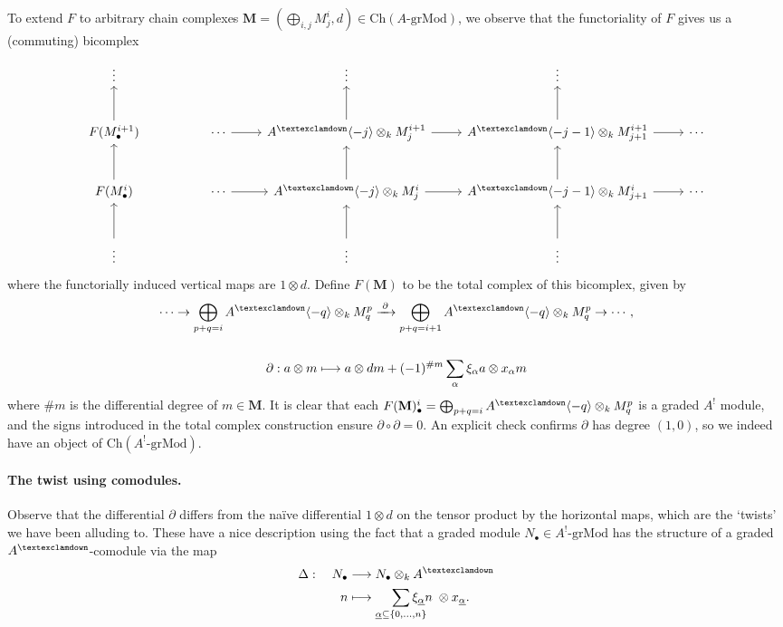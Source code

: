 \documentclass[a4paper]{article}
\theoremstyle{definition}
\theoremstyle{remark}
\newcommand{\grMod}{\ensuremath{\text{-grMod}}}
\newcommand{\Ch}{\ensuremath{\text{Ch}}}
\newcommand{\gnab}{{\textexclamdown}}
\begin{document}
To extend \(F\) to arbitrary chain complexes \(\mathbf{M}=(\bigoplus_{i,j}M^i_j,
d)\in \Ch(A\grMod)\), we observe that the functoriality of \(F\) gives us a (commuting) bicomplex
\[\begin{tikzcd}[row sep=large]
    \vdots 
           &            
           & 
           & \vdots 
           & \vdots 
           & \\
    F(M^{i+1}_\bullet) \arrow[u]
           & 
           & \cdots \arrow[r]
           & A^\gnab \langle -j \rangle\otimes_k M^{i+1}_j \arrow[r] \arrow[u]
           & A^\gnab \langle -j-1 \rangle\otimes_k M^{i+1}_{j+1} \arrow[r] \arrow[u]
           & \cdots \\
    F(M^{i}_\bullet) \arrow[u]
           & 
           & \cdots \arrow[r]
           & A^\gnab \langle -j \rangle\otimes_k M^{i}_j  \arrow[r] \arrow[u]
           & A^\gnab\langle -j-1 \rangle\otimes_k M^{i}_{j+1}  \arrow[r] \arrow[u]
           & \cdots \\
    \vdots \arrow[u]
           &            
           & 
           & \vdots \arrow[u] 
           & \vdots \arrow[u]
           &   
\end{tikzcd}\]
where the functorially induced vertical maps are \(1\otimes d\). Define
\(F(\mathbf{M})\) to be the total complex of this bicomplex, given by
\begin{gather*}
    \cdots \rightarrow \bigoplus_{p+q=i}A^\gnab\langle -q \rangle \otimes_k
    M^p_q \xrightarrow{\;\partial\;} \bigoplus_{p+q=i+1}A^\gnab\langle -q
    \rangle\otimes_k M^p_q \rightarrow \cdots,  \\ \\
    \partial: a\otimes m \longmapsto a\otimes dm + (-1)^{\#m}\sum_\alpha
    \xi_\alpha a \otimes x_\alpha m
\end{gather*}
where \(\#m\) is the differential degree of \(m\in \mathbf{M}\). It is clear
that each \(F(\textbf{M})^i_\bullet = \bigoplus_{p+q=i}A^\gnab\langle -q\rangle
\otimes_k M^p_q\) is a graded \(A^!\) module, and the signs introduced in the
total complex construction ensure \(\partial \circ \partial = 0\). An explicit
check confirms \(\partial\) has degree \((1,0)\), so we indeed have an object of
\(\Ch(A^!\grMod)\).

\paragraph{The twist using comodules.}
\label{comoduletwist}
Observe that the differential \(\partial\) differs from the na\"ive differential
\(1\otimes d\) on the tensor product by the horizontal maps, which are the
`twists' we have been alluding to. These have a nice description using the fact
that a graded module \(N_\bullet\in A^!\grMod\) has the structure of a
graded \(A^\gnab\)-comodule via the map
\begin{align*}
    \Delta: \quad N_\bullet &\longrightarrow N_\bullet \otimes_k A^\gnab \\
    n &\longmapsto \smashoperator[r]{\sum\limits_{\underline{\alpha}\subseteq
    \{0,...,n\}}} \xi_{\underline{\alpha}} n
    \; \otimes   x_{\underline{\alpha}}.
\end{align*}
\end{document}
